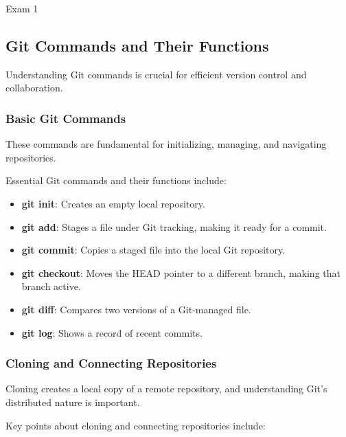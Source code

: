\begin{examnotes}{Exam 1}
    \subsection*{Git Commands and Their Functions}
    
    Understanding Git commands is crucial for efficient version control and collaboration.
    
    \subsubsection*{Basic Git Commands}
    
    These commands are fundamental for initializing, managing, and navigating repositories.
    
    \begin{highlight}
        Essential Git commands and their functions include:
        
        \begin{itemize}
            \item \textbf{git init}: Creates an empty local repository.
            \item \textbf{git add}: Stages a file under Git tracking, making it ready for a commit.
            \item \textbf{git commit}: Copies a staged file into the local Git repository.
            \item \textbf{git checkout}: Moves the HEAD pointer to a different branch, making that branch active.
            \item \textbf{git diff}: Compares two versions of a Git-managed file.
            \item \textbf{git log}: Shows a record of recent commits.
        \end{itemize}
    \end{highlight}
    
    \subsubsection*{Cloning and Connecting Repositories}
    
    Cloning creates a local copy of a remote repository, and understanding Git's distributed nature is important.
    
    \begin{highlight}
        Key points about cloning and connecting repositories include:
        

\end{highlight}
\end{examnotes}
